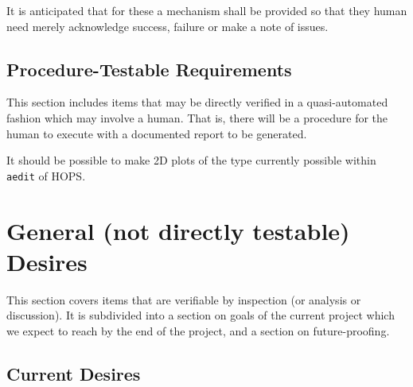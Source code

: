 It is anticipated that for these a mechanism shall be provided
so that they human need merely acknowledge success, failure or
make a note of issues.

\subsection{Procedure-Testable Requirements}
\label{sec:procedure}

This section includes items that may be directly verified in a quasi-automated
fashion which may involve a human.  That is, there will be a procedure for the
human to execute with a documented report to be generated.

\begin{description}
 It should be possible to make 2D plots of the type
    currently possible within \texttt{\ac{aedit}} of \ac{HOPS}.
 \FIXME[more]


\end{description}

\section{General (not directly testable) Desires}
\label{sec:desires}

This section covers items that are verifiable by inspection (or analysis
or discussion).  It is subdivided into a section on goals of the current
project which we expect to reach by the end of the project, and a section
on future-proofing.

\subsection{Current Desires}
\label{sec:currentdesires}


